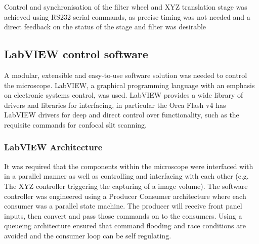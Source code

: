 Control and synchronisation of the filter wheel and XYZ translation stage was achieved using RS232 serial commands, as precise timing was not needed and a direct feedback on the status of the stage and filter was desirable %

%



\subsection{LabVIEW control software}

A modular, extensible and easy-to-use software solution was needed to control the microscope.
LabVIEW, a graphical programming language with an emphasis on electronic systems control, was used.
LabVIEW provides a wide library of drivers and libraries for interfacing, in particular the Orca Flash v4 has LabVIEW drivers for deep and direct control over functionality, such as the requisite commands for confocal slit scanning.

\subsubsection{LabVIEW Architecture}


It was required that the components within the microscope were interfaced with in a parallel manner as well as controlling and interfacing with each other (e.g. The XYZ controller triggering the capturing of a image volume).
The software controller was engineered using a Producer Consumer architecture where each consumer was a parallel state machine.
The producer will receive front panel inputs, then convert and pass those commands on to the consumers.
Using a queueing architecture ensured that command flooding and race conditions are avoided and the consumer loop can be self regulating.

